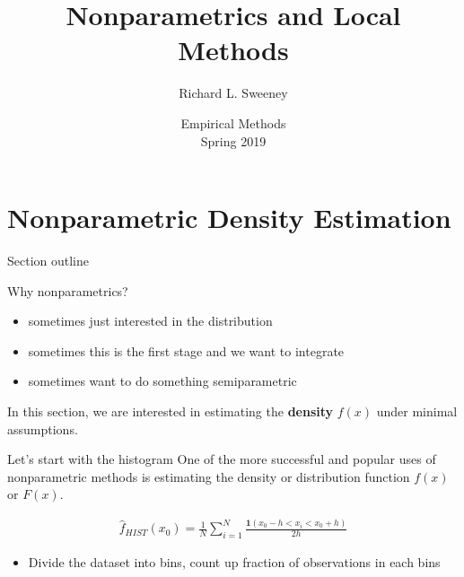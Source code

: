 

\setlength{\parskip}{5pt} 

\usepackage{comment}

\title [Non-parametrics]{Nonparametrics and Local Methods}
\author{Richard L. Sweeney}
\date{Empirical Methods \\ Spring 2019}




\begin{frame}
\titlepage
\end{frame}

\begin{frame}
  \tableofcontents  
\end{frame}

\section[Density Estimation]{Nonparametric Density Estimation}

\begin{frame}{Section outline}

Why nonparametrics?
\begin{itemize}
  \item sometimes just interested in the distribution %
  \item sometimes this is the first stage and we want to integrate
  \item sometimes want to do something semiparametric 
\end{itemize}

In this section, we are interested in estimating the \textbf{density} $f(x)$ under minimal assumptions. 

\end{frame}

\begin{frame}{Let's start with the histogram}
  One of the more successful and popular uses of nonparametric methods is estimating the density or distribution function $f(x)$ or $F(x)$.
  
  \begin{eqnarray*}
    \hat{f}_{HIST}(x_0) = \frac{1}{N} \sum_{i=1}^N \frac{\mathbf{1}(x_0 - h < x_i < x_0 + h)}{2 h}
  \end{eqnarray*}
    
  \begin{itemize}
  \item Divide the dataset into bins, count up fraction of observations in each bins
  \end{itemize}
\end{frame}
 
